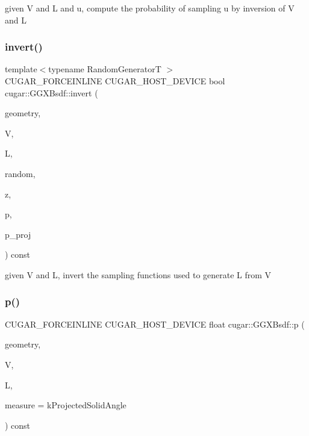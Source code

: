 given V and L and u, compute the probability of sampling u by inversion of V and L \mbox{\label{structcugar_1_1_g_g_x_bsdf_a159b40b9d3529fe77865ece0eb564568}} 
\subsubsection{\texorpdfstring{invert()}{invert()}}
{\footnotesize\ttfamily template$<$typename Random\+GeneratorT $>$ \\
C\+U\+G\+A\+R\+\_\+\+F\+O\+R\+C\+E\+I\+N\+L\+I\+NE C\+U\+G\+A\+R\+\_\+\+H\+O\+S\+T\+\_\+\+D\+E\+V\+I\+CE bool cugar\+::\+G\+G\+X\+Bsdf\+::invert (\begin{DoxyParamCaption}\item[{const \hyperlink{structcugar_1_1_differential_geometry}{Differential\+Geometry} \&}]{geometry,  }\item[{const \hyperlink{structcugar_1_1_vector}{Vector3f}}]{V,  }\item[{const \hyperlink{structcugar_1_1_vector}{Vector3f}}]{L,  }\item[{Random\+GeneratorT \&}]{random,  }\item[{\hyperlink{structcugar_1_1_vector}{Vector3f} \&}]{z,  }\item[{float \&}]{p,  }\item[{float \&}]{p\+\_\+proj }\end{DoxyParamCaption}) const\hspace{0.3cm}{\ttfamily [inline]}}

given V and L, invert the sampling functions used to generate L from V \mbox{\label{structcugar_1_1_g_g_x_bsdf_a47b841b65fb62b596e3c436567b9912d}} 
\subsubsection{\texorpdfstring{p()}{p()}}
{\footnotesize\ttfamily C\+U\+G\+A\+R\+\_\+\+F\+O\+R\+C\+E\+I\+N\+L\+I\+NE C\+U\+G\+A\+R\+\_\+\+H\+O\+S\+T\+\_\+\+D\+E\+V\+I\+CE float cugar\+::\+G\+G\+X\+Bsdf\+::p (\begin{DoxyParamCaption}\item[{const \hyperlink{structcugar_1_1_differential_geometry}{Differential\+Geometry} \&}]{geometry,  }\item[{const \hyperlink{structcugar_1_1_vector}{Vector3f}}]{V,  }\item[{const \hyperlink{structcugar_1_1_vector}{Vector3f}}]{L,  }\item[{const Spherical\+Measure}]{measure = {\ttfamily kProjectedSolidAngle} }\end{DoxyParamCaption}) const\hspace{0.3cm}{\ttfamily [inline]}}

